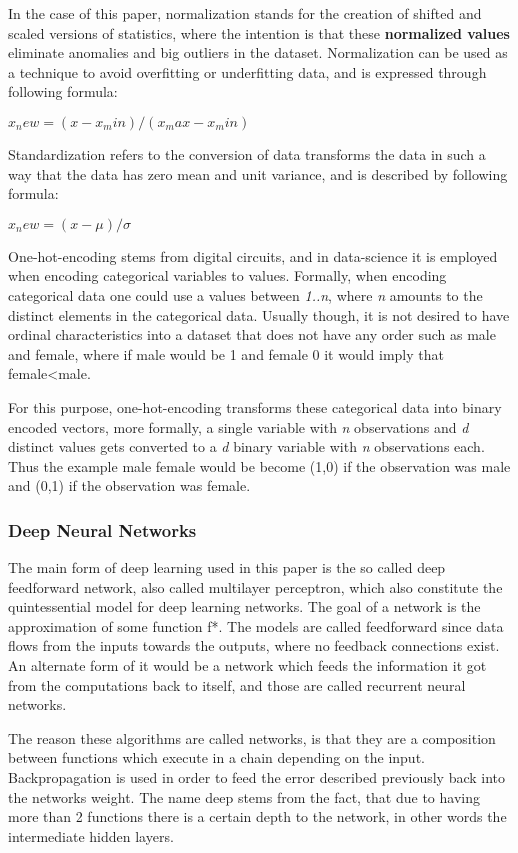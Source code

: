 \documentclass[12pt]{article}
\begin{document}
In the case of this paper, normalization stands for the creation of shifted and scaled versions of statistics, where the intention is that these \textbf{normalized values} eliminate anomalies and big outliers in the dataset. Normalization can be used as a technique to avoid overfitting or underfitting data, and is expressed through following formula:

$x_new = (x - x_min)/(x_max - x_min)$

Standardization refers to  the conversion of data transforms the data in such a way that the data has zero mean and unit variance, and is described by following formula:

$x_new = (x - \mu) / \sigma$


One-hot-encoding stems from digital circuits, and in data-science it is employed when encoding categorical variables to values. Formally, when encoding categorical data one could use a values between \textit{1..n}, where \textit{n} amounts to the distinct elements in the categorical data. Usually though, it is not desired to have ordinal characteristics into a dataset that does not have any order such as male and female, where if male would be 1 and female 0 it would imply that female<male.

For this purpose, one-hot-encoding transforms these categorical data into binary encoded vectors, more formally, a single variable with \textit{n} observations and \textit{d} distinct values gets converted to a \textit{d} binary variable with \textit{n} observations each. Thus the example male female would be become (1,0) if the observation was male and (0,1) if the observation was female.

\subsubsection{Deep Neural Networks}
\label{subsub:deep_nets}

The main form of deep learning used in this paper is the so called deep feedforward network, also called multilayer perceptron, which also constitute the quintessential model for deep learning networks. The goal of a network is the approximation of some function f*. The models are called feedforward since data flows from the inputs towards the outputs, where no feedback connections exist. An alternate form of it would be a network which feeds the information it got from the computations back to itself, and those are called recurrent neural networks.

The reason these algorithms are called networks, is that they are a composition between functions which execute in a chain depending on the input. Backpropagation is used in order to feed the error described previously back into the networks weight. The name deep stems from the fact, that due to having more than 2 functions there is a certain depth to the network, in other words the intermediate hidden layers.
\end{document}

